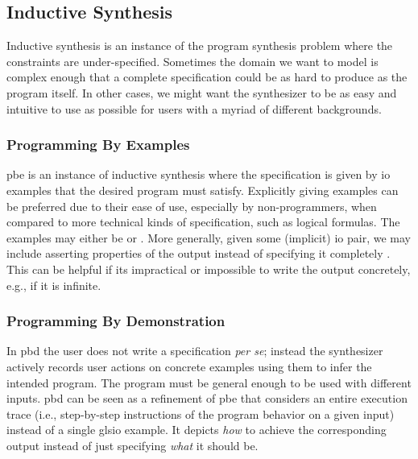 \subsection{Inductive Synthesis}
\label{sec:inductive}


Inductive synthesis is an instance of the program synthesis problem where the
constraints are under-specified. Sometimes the domain we want to model is
complex enough that a complete specification could be as hard to produce as the
program itself. In other cases, we might want the synthesizer to be as easy and
intuitive to use as possible for users with a myriad of different backgrounds.

\subsubsection{Programming By Examples}

\Gls{pbe} is an instance of inductive synthesis where the specification is given
by \gls{io} examples that the desired program must satisfy. Explicitly giving
examples can be preferred due to their ease of use, especially by
non-programmers, when compared to more technical kinds of specification, such as
logical formulas. The examples may either be  or . More generally, given some
(implicit) \gls{io} pair, we may include asserting properties of the output
instead of specifying it completely \cite{Gulwani2017, Polozov:2015:FFI}. This
can be helpful if its impractical or impossible to write the output concretely,
e.g., if it is infinite.

\subsubsection{Programming By Demonstration}


In \gls{pbd} the user does not write a specification \textit{per se}; instead the
synthesizer actively records user actions on concrete examples using them to
infer the intended program. The program must be general enough to be used
with different inputs. \gls{pbd} can be seen as a refinement of \gls{pbe} that
considers an entire execution trace (i.e., step-by-step instructions of the
program behavior on a given input) instead of a single gls{io} example. It
depicts \textit{how} to achieve the corresponding output instead of just
specifying \textit{what} it should be.

